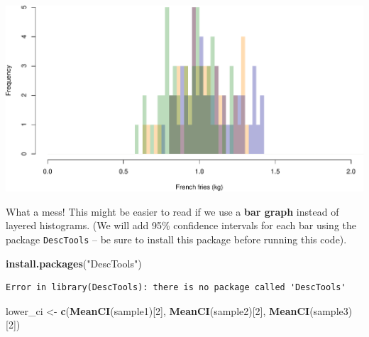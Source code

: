 \documentclass[]{book}
\newenvironment{Shaded}{\begin{snugshade}}{\end{snugshade}}
\newcommand{\CommentTok}[1]{\textcolor[rgb]{0.56,0.35,0.01}{\textit{#1}}}
\newcommand{\DecValTok}[1]{\textcolor[rgb]{0.00,0.00,0.81}{#1}}
\newcommand{\KeywordTok}[1]{\textcolor[rgb]{0.13,0.29,0.53}{\textbf{#1}}}
\newcommand{\NormalTok}[1]{#1}
\newcommand{\StringTok}[1]{\textcolor[rgb]{0.31,0.60,0.02}{#1}}
\begin{document}
\includegraphics{figures/unnamed-chunk-325-1.pdf}

What a mess! This might be easier to read if we use a \textbf{bar graph} instead of layered histograms. (We will add 95\% confidence intervals for each bar using the package \texttt{DescTools} -- be sure to install this package before running this code).

\begin{Shaded}
\begin{Highlighting}[]
\KeywordTok{install.packages}\NormalTok{(}\StringTok{"DescTools"}\NormalTok{)}
\end{Highlighting}
\end{Shaded}

\begin{Shaded}
\end{Shaded}

\begin{verbatim}
Error in library(DescTools): there is no package called 'DescTools'
\end{verbatim}

\begin{Shaded}
\begin{Highlighting}[]
\NormalTok{lower_ci <-}\StringTok{ }\KeywordTok{c}\NormalTok{(}\KeywordTok{MeanCI}\NormalTok{(sample1)[}\DecValTok{2}\NormalTok{],}
              \KeywordTok{MeanCI}\NormalTok{(sample2)[}\DecValTok{2}\NormalTok{],}
              \KeywordTok{MeanCI}\NormalTok{(sample3)[}\DecValTok{2}\NormalTok{])}
\end{Highlighting}
\end{Shaded}
\end{document}
